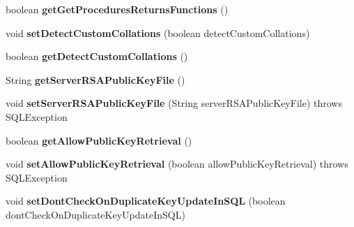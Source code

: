 \begin{DoxyCompactItemize}
boolean {\bfseries get\+Get\+Procedures\+Returns\+Functions} ()
\item 
\mbox{\label{classcom_1_1mysql_1_1jdbc_1_1_connection_properties_impl_adaad8af165e6328918b0de08e617e0d7}} 
void {\bfseries set\+Detect\+Custom\+Collations} (boolean detect\+Custom\+Collations)
\item 
\mbox{\label{classcom_1_1mysql_1_1jdbc_1_1_connection_properties_impl_a63ba6c79f70b4bb1a2b2cdba1c182562}} 
boolean {\bfseries get\+Detect\+Custom\+Collations} ()
\item 
\mbox{\label{classcom_1_1mysql_1_1jdbc_1_1_connection_properties_impl_a8a061f6700f3346d186c57302870bff0}} 
String {\bfseries get\+Server\+R\+S\+A\+Public\+Key\+File} ()
\item 
\mbox{\label{classcom_1_1mysql_1_1jdbc_1_1_connection_properties_impl_a390f3920c214d7a9e7dbcf2c82b2ee88}} 
void {\bfseries set\+Server\+R\+S\+A\+Public\+Key\+File} (String server\+R\+S\+A\+Public\+Key\+File)  throws S\+Q\+L\+Exception 
\item 
\mbox{\label{classcom_1_1mysql_1_1jdbc_1_1_connection_properties_impl_a69ac8cd6f4800416e82c0c358ce42c50}} 
boolean {\bfseries get\+Allow\+Public\+Key\+Retrieval} ()
\item 
\mbox{\label{classcom_1_1mysql_1_1jdbc_1_1_connection_properties_impl_a82f62a00f400376130daa771d36e6d5a}} 
void {\bfseries set\+Allow\+Public\+Key\+Retrieval} (boolean allow\+Public\+Key\+Retrieval)  throws S\+Q\+L\+Exception 
\item 
\mbox{\label{classcom_1_1mysql_1_1jdbc_1_1_connection_properties_impl_a2353c38280d549a1ee7f66212ad8a609}} 
void {\bfseries set\+Dont\+Check\+On\+Duplicate\+Key\+Update\+In\+S\+QL} (boolean dont\+Check\+On\+Duplicate\+Key\+Update\+In\+S\+QL)
\item 
\mbox{\label{classcom_1_1mysql_1_1jdbc_1_1_connection_properties_impl_ab8df795befe124b1540be4073601786d}} 

\end{DoxyCompactItemize}
